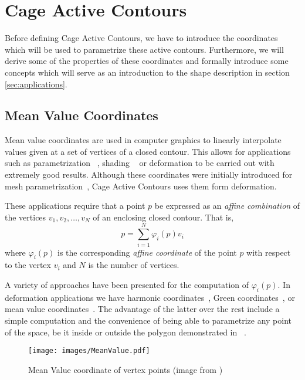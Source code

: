 \newpage
\chapter{Cage Active Contours}
\label{sec:cage_active_contours}

Before defining Cage Active Contours, we have to introduce the coordinates which will be used to parametrize these active contours. Furthermore, we will derive some of the properties of these coordinates and formally introduce some concepts which will serve as an introduction to the shape description in section \ref{sec:applications}. 

\section{Mean Value Coordinates}
\label{sec:mean_value_coordinates}

Mean value coordinates are used in computer graphics to linearly interpolate values given at a set of vertices of a closed
contour. This allows for applications such as parametrization ~\cite{Kobayashi2003,Coquillart1990,Floater1999117}, shading ~\cite{Goraud,Phong:1975:ICG:360825.360839} or deformation to be carried out with extremely good results.
Although these coordinates were initially introduced for mesh parametrization~\cite{Floater2003},
Cage Active Contours uses them form deformation.

These applications require that a point $p$ be expressed as an \emph{affine	combination} of the vertices $v_1,v_2,\dots, v_N$ of an enclosing closed contour. That is,
\begin{equation}
p = \sum\limits_{i=1}^N \varphi_i(p) v_i
\label{equ:recover}
\end{equation}
where $\varphi_i(p)$ is  the corresponding \emph{affine coordinate} of the point $p$ with respect to the vertex $v_i$ and $N$ is the number of vertices.

A variety of approaches have been presented for the computation of
$\varphi_i(p)$.  In deformation applications we have harmonic coordinates~\cite{Joschi2007},
Green coordinates~\cite{Lipman2008}, or mean value coordinates~\cite{Floater2003}. The advantage of the latter over the rest include a simple computation and the convenience of being able to parametrize any point of the space, 
be it inside or outside the polygon demonstrated in ~\cite{Hormann2006}.
\begin{figure}[h!]
	\centering
	{\texttt{[image: images/MeanValue.pdf]}}
	\caption{Mean Value coordinate of vertex points (image from \cite{ipcac2015})} \label{fig:calculateMVC}
\end{figure}


